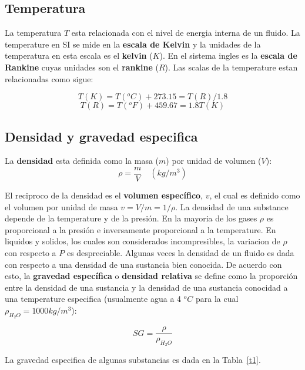 \documentclass[10pt, oneside]{article}
\begin{document}
\subsection{Temperatura}
La temperatura $T$ esta relacionada con el nivel de energia interna de un fluido. La temperature  en SI se mide en la \textbf{escala de Kelvin} y la unidades de la temperatura en esta escala es el \textbf{kelvin} ($K$). En el sistema ingles es la \textbf{escala de Rankine} cuyas unidades son el \textbf{rankine} ($R$). Las scalas de la temperature estan relacionadas como sigue:

\begin{equation}
T(K)=T(^oC) + 273.15 = T(R)/1.8
\end{equation}
\begin{equation}
T(R)=T(^oF) + 459.67 = 1.8T(K)
\end{equation}

\subsection{Densidad y gravedad especifica}
La \textbf{densidad} esta definida como la masa ($m$) por unidad de volumen ($V$):
\begin{equation}
\rho = \frac{m}{V} \quad (kg/m^3)
\end{equation}

El reciproco de la densidad es el \textbf{volumen espec\'ifico}, $v$, el cual es definido como el volumen por unidad de masa $v=V/m=1/\rho$.
La densidad de una substance depende de la temperature y de la presi\'on. En la mayoria de los gases $\rho$ es proporcional a la presi\'on e inversamente proporcional a la temperature. En liquidos y solidos, los cuales son considerados incompresibles, la variacion de $\rho$ con respecto a $P$ es despreciable. 
Algunas veces la densidad de un fluido es dada con respecto a una densidad de una sustancia bien conocida. De acuerdo con esto, la \textbf{gravedad espec\'ifica} o \textbf{densidad relativa} se define como la proporci\'on entre la densidad de una sustancia y la densidad de una sustancia conocidad a una temperature especifica (usualmente agua a 4 $^oC$ para la cual $\rho_{H_2 O}=1000 kg/m^3$):

\begin{equation}
SG = \frac{\rho}{\rho_{H_2 O}} 
\end{equation}

La gravedad especifica de algunas substancias es dada en la Tabla~\ref{t1}.
\end{document}

